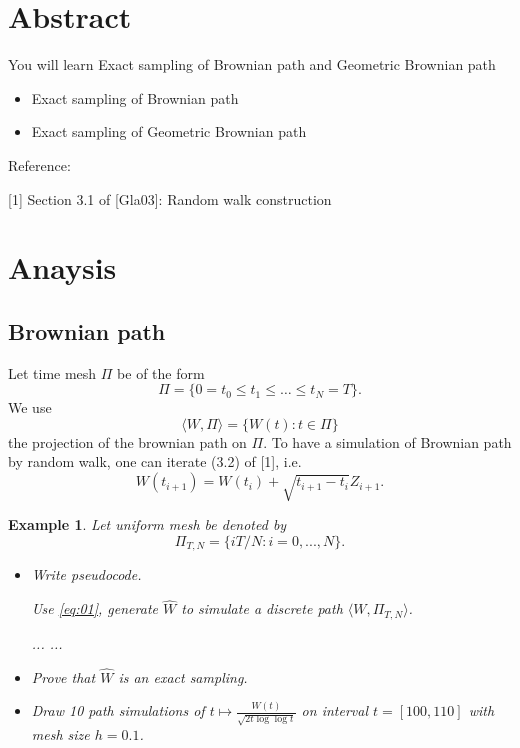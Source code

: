 \documentclass{article}
\newtheorem{example}{Example}
\begin{document}
\section{Abstract}
You will learn Exact sampling of Brownian path and Geometric Brownian path

\begin{itemize}
 \item Exact sampling of Brownian path
 \item Exact sampling of Geometric Brownian path
\end{itemize}

Reference: 

[1] Section 3.1 of [Gla03]: Random walk construction

\section{Anaysis}
\subsection{Brownian path}
Let time mesh $\Pi$ be of the form
$$\Pi = \{0 = t_0 \le t_1 \le \ldots \le t_N = T\}.$$
We use
$$\langle W, \Pi\rangle  = \{W(t): t\in \Pi\}$$
the projection of the brownian path on $\Pi$.
To have a simulation of Brownian path by random walk, one can iterate (3.2) of [1], i.e.
\begin{equation}\label{eq:01}
W(t_{i+1}) = W(t_i) + \sqrt{t_{i+1} - t_i} Z_{i+1}.
\end{equation}

\begin{example}
\label{exm:01}
Let uniform mesh be denoted by $$\Pi_{T, N} = \{i T/N: i = 0, ..., N\}.$$
\begin{itemize}
\item 
Write pseudocode.
\begin{algorithm}
\caption{Use  \eqref{eq:01}, generate $\hat W$ to simulate a discrete path $\langle W, \Pi_{T, N}\rangle$. }
\label{alg:bm}
\begin{algorithmic}[1]
\State   ...
\State  ...
\EndProcedure
\end{algorithmic}
\end{algorithm}
\item Prove that $\hat W$ is an exact sampling.
\item Draw 10 path simulations of $t\mapsto \frac{W(t)}{\sqrt{2t \log\log t}}$ on interval $t= [100, 110]$ with mesh size $h = 0.1$.
\end{itemize}
\end{example}
\end{document}
